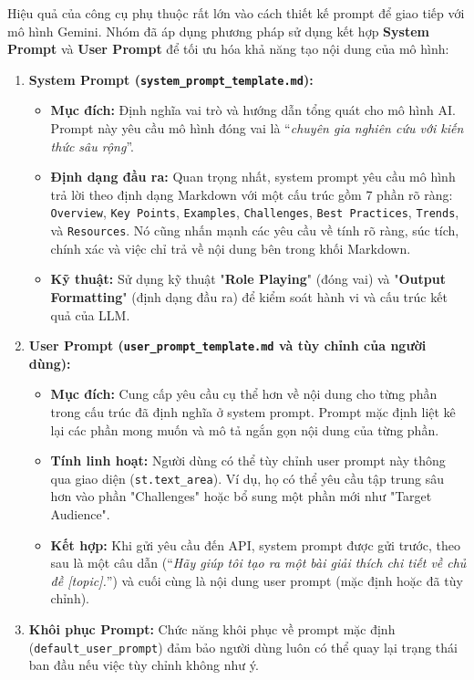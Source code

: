 Hiệu quả của công cụ phụ thuộc rất lớn vào cách thiết kế prompt để giao tiếp với mô hình Gemini. Nhóm đã áp dụng phương pháp sử dụng kết hợp \textbf{System Prompt} và \textbf{User Prompt} để tối ưu hóa khả năng tạo nội dung của mô hình:
\begin{enumerate}
    \item \textbf{System Prompt (\texttt{system\_prompt\_template.md}):}
    \begin{itemize}
        \item \textbf{Mục đích:} Định nghĩa vai trò và hướng dẫn tổng quát cho mô hình AI. Prompt này yêu cầu mô hình đóng vai là ``\textit{chuyên gia nghiên cứu với kiến thức sâu rộng}''.

        \item \textbf{Định dạng đầu ra:} Quan trọng nhất, system prompt yêu cầu mô hình trả lời theo định dạng Markdown với một cấu trúc gồm 7 phần rõ ràng: \texttt{Overview}, \texttt{Key Points}, \texttt{Examples}, \texttt{Challenges}, \texttt{Best Practices}, \texttt{Trends}, và \texttt{Resources}. Nó cũng nhấn mạnh các yêu cầu về tính rõ ràng, súc tích, chính xác và việc chỉ trả về nội dung bên trong khối Markdown.
        
        \item \textbf{Kỹ thuật:} Sử dụng kỹ thuật "\textbf{Role Playing}" (đóng vai) và "\textbf{Output Formatting}" (định dạng đầu ra) để kiểm soát hành vi và cấu trúc kết quả của LLM.
    \end{itemize}

    \item \textbf{User Prompt (\texttt{user\_prompt\_template.md} và tùy chỉnh của người dùng):}
    \begin{itemize}
        \item \textbf{Mục đích:} Cung cấp yêu cầu cụ thể hơn về nội dung cho từng phần trong cấu trúc đã định nghĩa ở system prompt. Prompt mặc định liệt kê lại các phần mong muốn và mô tả ngắn gọn nội dung của từng phần.

        \item \textbf{Tính linh hoạt:} Người dùng có thể tùy chỉnh user prompt này thông qua giao diện (\texttt{st.text\_area}). Ví dụ, họ có thể yêu cầu tập trung sâu hơn vào phần "Challenges" hoặc bổ sung một phần mới như "Target Audience".
        
        \item \textbf{Kết hợp:} Khi gửi yêu cầu đến API, system prompt được gửi trước, theo sau là một câu dẫn (``\textit{Hãy giúp tôi tạo ra một bài giải thích chi tiết về chủ đề [topic].}'') và cuối cùng là nội dung user prompt (mặc định hoặc đã tùy chỉnh).
    \end{itemize}

    \item \textbf{Khôi phục Prompt:} Chức năng khôi phục về prompt mặc định (\texttt{default\_user\_prompt}) đảm bảo người dùng luôn có thể quay lại trạng thái ban đầu nếu việc tùy chỉnh không như ý.
\end{enumerate}

